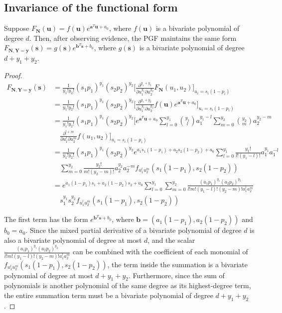 \documentclass{article}
\begin{document}
\subsection{Invariance of the functional form}
Suppose $F_\mathbf{N}(\mathbf{u}) = f(\mathbf{u}) e^{\mathbf{a}^T \mathbf{u} + a_0}$, where $f(\mathbf{u})$ is a bivariate polynomial of degree $d$. Then, after observing evidence, the PGF maintains the same form $F_{\mathbf{N}, \mathbf{Y} = \mathbf{y}}(\mathbf{s}) = g(\mathbf{s}) e^{\mathbf{b}^T \mathbf{s} + b_0}$, where $g(\mathbf{s})$ is a bivariate polynomial of degree $d + y_1 + y_2$.

\begin{proof}

\begin{align*}
F_{\mathbf{N}, \mathbf{Y} = \mathbf{y}}(\mathbf{s})
&= \frac{1}{y_1!y_2!} (s_1p_1)^{y_1} (s_2p_2)^{y_2} \bigg[ \frac{\partial^{y_1+y_2}}{\partial u_1^{y_1} \partial u_2^{y_2}} F_{\mathbf{N}}(u_1, u_2) \bigg]_{u_i = s_i(1-p_i)} \\
&= \frac{1}{y_1!y_2!} (s_1p_1)^{y_1} (s_2p_2)^{y_2} \bigg[ \frac{\partial^{y_1+y_2}}{\partial u_1^{y_1} \partial u_2^{y_2}} f(\mathbf{u}) e^{\mathbf{a}^T \mathbf{u} + a_0} \bigg]_{u_i = s_i(1-p_i)} \\
&= \frac{1}{y_1!y_2!} (s_1p_1)^{y_1} (s_2p_2)^{y_2} \bigg[ e^{\mathbf{a}^T \mathbf{u} + a_0} \sum_{l=0}^{y_1} {y_1 \choose l} a_1^{y_1 - l} \sum_{m=0}^{y_2} {y_2 \choose m} a_2^{y_2 - m} \\
& \quad \frac{\partial^{l+m}}{\partial u_1^{l} \partial u_2^{m}} f(u_1, u_2) \bigg]_{u_i = s_i(1-p_i)} \\
&= \frac{1}{y_1! y_2!} (s_1 p_1)^{y_1} (s_2 p_2)^{y_2} e^{a_1 s_1 (1-p_1) + a_2 s_2 (1-p_2) + a_0} \sum_{l=0}^{y_1} \frac{y_1!}{l! (y_1 - l)!} a_1^{y_1} a_1^{- l} \\
& \quad \sum_{m=0}^{y_2} \frac{y_2!}{m! (y_2 - m)!} a_2^{y_2} a_2^{- m} f_{u_1^l u_2^m}(s_1(1-p_1), s_2(1-p_2))  \\
&= e^{a_1(1-p_1)s_1 + a_2(1-p_2)s_2 + a_0} \sum_{l=0}^{y_1} \sum_{m=0}^{y_2} \frac{(a_1p_1)^{y_1} (a_2p_2)^{y_2}}{l! m! (y_1 - l)! (y_2 - m)! a_1^{l} a_2^{m}} \\
& \quad s_1^{y_1} s_2^{y_2} f_{u_1^l u_2^m}(s_1(1-p_1), s_2(1-p_2))
\end{align*}

The first term has the form $e^{\mathbf{b}^T \mathbf{s} + b_0}$, where $\mathbf{b} = (a_1(1-p_1), a_2(1-p_2))$ and $b_0 = a_0$. Since the mixed partial derivative of a bivariate polynomial of degree $d$ is also a bivariate polynomial of degree at most $d$, and the scalar $\frac{(a_1p_1)^{y_1} (a_2p_2)^{y_2}}{l! m! (y_1 - l)! (y_2 - m)! a_1^{l} a_2^{m}}$ can be combined with the coefficient of each monomial of $f_{u_1^l u_2^m}(s_1(1-p_1), s_2(1-p_2))$, the term inside the summation is a bivariate polynomial of degree at most $d + y_1 + y_2$. Furthermore, since the sum of polynomials is another polynomial of the same degree as its highest-degree term, the entire summation term must be a bivariate polynomial of degree $d + y_1 + y_2$.

\end{proof}
\end{document}
